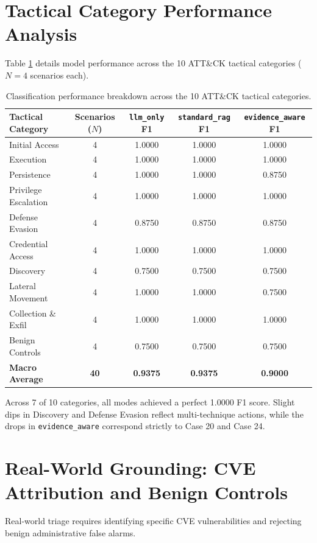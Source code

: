\section{Tactical Category Performance Analysis}
\label{sec:tactical_category_perf}
Table \ref{tab:category_performance_summary} details model performance across the 10 ATT\&CK tactical categories ($N=4$ scenarios each).

\begin{table}[!htbp]
\centering
\caption{Classification performance breakdown across the 10 ATT\&CK tactical categories.}
\label{tab:category_performance_summary}
\footnotesize
\setlength{\tabcolsep}{4.5pt}
\begin{tabularx}{\textwidth}{@{}X c c c c@{}}
\toprule
\textbf{Tactical Category} & \textbf{Scenarios ($N$)} & \textbf{\texttt{llm\_only} F1} & \textbf{\texttt{standard\_rag} F1} & \textbf{\texttt{evidence\_aware} F1} \\
\midrule
Initial Access          & 4 & 1.0000 & 1.0000 & 1.0000 \\
Execution               & 4 & 1.0000 & 1.0000 & 1.0000 \\
Persistence              & 4 & 1.0000 & 1.0000 & 0.8750 \\
Privilege Escalation    & 4 & 1.0000 & 1.0000 & 1.0000 \\
Defense Evasion         & 4 & 0.8750 & 0.8750 & 0.8750 \\
Credential Access       & 4 & 1.0000 & 1.0000 & 1.0000 \\
Discovery               & 4 & 0.7500 & 0.7500 & 0.7500 \\
Lateral Movement        & 4 & 1.0000 & 1.0000 & 0.7500 \\
Collection \& Exfil     & 4 & 1.0000 & 1.0000 & 1.0000 \\
Benign Controls         & 4 & 0.7500 & 0.7500 & 0.7500 \\
\midrule
\textbf{Macro Average}  & \textbf{40} & \textbf{0.9375} & \textbf{0.9375} & \textbf{0.9000} \\
\bottomrule
\end{tabularx}
\end{table}

Across 7 of 10 categories, all modes achieved a perfect 1.0000 F1 score. Slight dips in Discovery and Defense Evasion reflect multi-technique actions, while the drops in \texttt{evidence\_aware} correspond strictly to Case 20 and Case 24.

\section{Real-World Grounding: CVE Attribution and Benign Controls}
\label{sec:grounding_cve_benign}
Real-world triage requires identifying specific CVE vulnerabilities and rejecting benign administrative false alarms.

